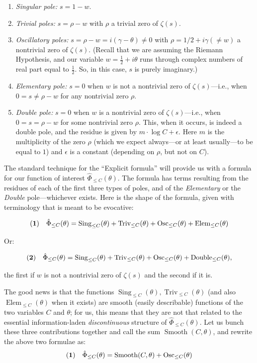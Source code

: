 \documentclass[openany]{book}
\DeclareMathOperator{\Sing}{Sing}
\DeclareMathOperator{\Triv}{Triv}
\DeclareMathOperator{\Osc}{Osc}
\DeclareMathOperator{\Elem}{Elem}
\DeclareMathOperator{\Double}{Double}
\DeclareMathOperator{\Smooth}{Smooth}
\theoremstyle{plain}
\theoremstyle{definition}
\newcommand{\RH}{Riemann Hypothesis\index{Riemann Hypothesis}}
\begin{document}
{{ \begin{enumerate} \item {\it Singular pole:} $s= 1-w$.
                        \item {\it Trivial poles:}  $s= \rho-w$ with $\rho$ a trivial zero of $\zeta(s)$.
                        \item  {\it Oscillatory poles:} $s= \rho-w = i(\gamma-\theta) \ne 0$ with $\rho= 1/2 + i \gamma (\ne w)$ a nontrivial zero of $\zeta(s)$. (Recall that we are assuming the \RH{}, and our variable $w= {\frac{1}{2}}+i\theta$ runs through complex numbers of real part equal to ${\frac{1}{2}}$. So, in this case, $s$ is purely imaginary.)
                        \item {\it Elementary pole:} $s=0$ when  $ w$ is not a nontrivial zero of $\zeta(s)$---i.e., when $0=s\ne\rho-w$ for any nontrivial zero $\rho$.
                        \item {\it Double pole:}  $s=0$ when  $ w$ is a nontrivial zero of $\zeta(s)$---i.e., when $0=s=\rho-w$ for some nontrivial zero $\rho$. This, when it occurs, is indeed a double pole, and the residue is given by $m\cdot \log C +\epsilon$.  Here $m$ is the multiplicity of the zero $\rho$  (which we expect always---or at least usually---to be equal to $1$) and $\epsilon$ is a constant (depending on $\rho$, but not on $C$).

\end{enumerate}

           The standard technique for the ``Explicit formula'' will provide us with a formula for our function of interest  ${\hat \Phi}_{\le C}(\theta)$. The formula has terms resulting from the residues of each of the first three types of poles, and of the {\it Elementary} or  the  {\it Double} pole---whichever exists.  Here is the shape of the formula, given with terminology that is meant to be  evocative:


           $$ {\bf(1)}\ \ \ {\hat \Phi}_{\le C}(\theta) = {\Sing}_{\le C}(\theta) + {\Triv}_{\le C}(\theta) +  {\Osc}_{\le C}(\theta) + {\Elem}_{\le C}(\theta)$$

           Or:

           $${\bf(2)}\ \ \ {\hat \Phi}_{\le C}(\theta) = {\Sing}_{\le C}(\theta) + {\Triv}_{\le C}(\theta) +  {\Osc}_{\le C}(\theta) +  {\Double}_{\le C}(\theta),$$

           \noindent the first if $w$ is not a nontrivial zero of $\zeta(s)$ and the second if it is.

                     The good news is that  the functions ${\Sing}_{\le C}(\theta),  {\Triv}_{\le C}(\theta)$ (and also ${\Elem}_{\le C}(\theta)$ when it exists) are smooth (easily describable) functions of the two variables $C$ and $\theta$; for us, this means that they are
not that related to the essential information-laden {\it discontinuous} structure of  $ {\hat \Phi}_{\le C}(\theta)$. Let us bunch these three contributions together and call the sum ${\Smooth}(C,\theta)$, and rewrite the above two formulae as:
                       $$ {\bf(1)}\ \ \ {\hat \Phi}_{\le C}(\theta) ={\Smooth}(C,\theta) +  {\Osc}_{\le C}(\theta) $$

}}
\end{document}
